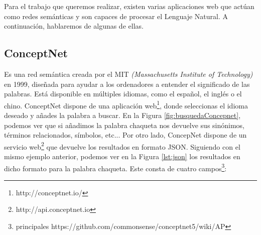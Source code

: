 Para el trabajo que queremos realizar, existen varias aplicaciones web que actúan como redes semánticas y son capaces de procesar el Lenguaje Natural.  A continuación, hablaremos de algunas de ellas.

\subsection{ConceptNet} 
\label{cap:subsec:concepnet}

Es una red semántica creada por el MIT \textit{(Massachusetts Institute of Technology)} en 1999, diseñada para ayudar a los ordenadores a entender el significado de las palabras. Está disponible en múltiples idiomas, como el español, el inglés o el chino. ConceptNet dispone de una aplicación web\footnote{http://conceptnet.io/}, donde seleccionas el idioma deseado y añades la palabra a buscar. En la Figura  \ref{fig:busquedaConcepnet}, podemos ver que si añadimos la palabra chaqueta nos devuelve sus sinónimos, términos relacionados, símbolos, etc...
Por otro lado, ConcepNet dispone de un servicio web\footnote{http://api.conceptnet.io} que devuelve los resultados en formato JSON. Siguiendo con el mismo ejemplo anterior, podemos ver en la Figura  \ref{lst:json} los resultados en dicho formato para la palabra chaqueta. Este consta de cuatro campos\footnote{principales https://github.com/commonsense/conceptnet5/wiki/AP}:
